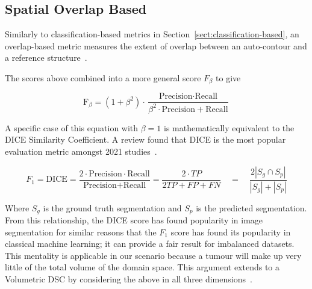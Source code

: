 \documentclass[11pt,twoside]{report}
\begin{document}
\subsection{Spatial Overlap Based}\label{sect:spatial-overlap-based}

Similarly to classification-based metrics in Section~\ref{sect:classification-based}, an overlap-based metric measures the extent of overlap between an auto-contour and a reference structure~\cite{review-metrics}.

The scores above combined into a more general score $F_\beta$ to give

\begin{equation*}
 \text{F}_\beta = (1+\beta^2)\cdot \frac{\text{Precision} \cdot \text{Recall}}{\beta^2 \cdot \text{Precision}+\text{Recall}}
\end{equation*}

A specific case of this equation with $\beta=1$ is mathematically equivalent to the DICE Similarity Coefficient. A review found that DICE is the most popular evaluation metric amongst 2021 studies~\cite{review-metrics,evaluation-metrics, Sherer2021-le}.


\begin{equation*}
 F_1 = \text{DICE} = \frac{2 \cdot \text{Precision} \cdot \text{Recall}} {\text{Precision} + \text{Recall}} = \frac{2 \cdot TP}{2TP + FP + FN} \quad = \quad \frac{2|S_g\cap S_p|}{|S_g|+|S_p|}
\end{equation*}

Where $S_g$ is the ground truth segmentation and $S_p$ is the predicted segmentation. From this relationship, the DICE score has found popularity in image segmentation for similar reasons that the $F_1$ score has found its popularity in classical machine learning; it can provide a fair result for imbalanced datasets. This mentality is applicable in our scenario because a tumour will make up very little of the total volume of the domain space. This argument extends to a Volumetric DSC by considering the above in all three dimensions~\cite{APL}.
\end{document}
